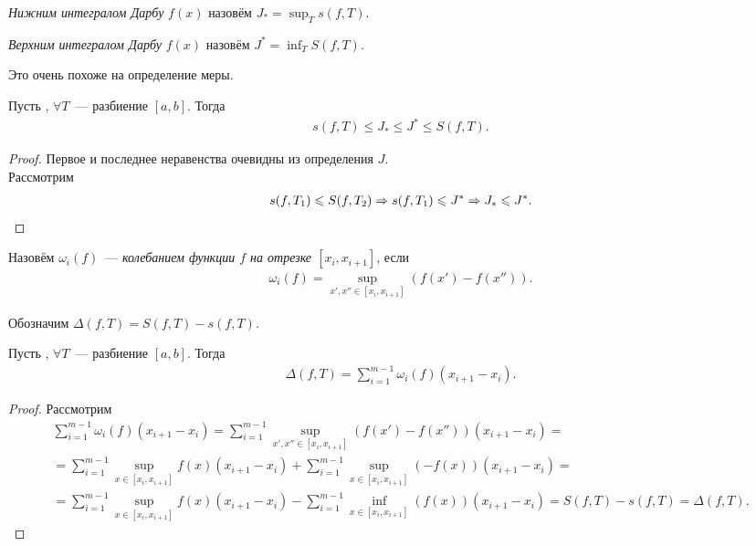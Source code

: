 \documentclass[../main.tex]{subfiles}
\begin{document}
\begin{definition}
   \emph{ Нижним интегралом Дарбу} $f(x)$ назовём $J_* = \sup_T s(f, T)$. 
\end{definition}

\begin{definition}
   \emph{ Верхним интегралом Дарбу} $f(x)$ назовём $J^* = \inf_T S(f, T)$.
\end{definition}

\begin{note}
    Это очень похоже на определение меры.
\end{note}


\begin{proposition}
    Пусть \fabr, $\forall T$~--- разбиение $[a,b]$. Тогда
    \begin{gather*}
        s(f, T) \leq J_* \leq J^* \leq S(f, T).
    \end{gather*}
\end{proposition}

\begin{proof}
    Первое и последнее неравенства очевидны из определения $J$. \\ 
    Рассмотрим
    \begin{gather*}
        s(f, T_1) \leqslant S(f, T_2) \Rightarrow s(f, T_1) \leqslant J^* \Rightarrow J_* \leqslant J^*.    
    \end{gather*}
\end{proof}

\begin{definition}
    Назовём $\omega_i(f)$~--- \emph{колебанием функции $f$ на отрезке $[x_i,x_{i+1}]$}, если 
    \begin{gather*}
        \omega_i(f) = \sup_{x',x'' \in [x_i,x_{i+1}]}(f(x') - f(x'')).
    \end{gather*}
\end{definition}

\begin{definition}
    Обозначим $\Delta(f, T) = S(f, T) - s(f, T)$.
\end{definition}

\begin{proposition}
    Пусть \fabr, $\forall T$~--- разбиение $[a,b]$. Тогда
    \begin{gather*}
        \Delta(f, T) = \sum_{i=1}^{m-1} \omega_i(f) (x_{i+1} - x_{i}).
    \end{gather*}
\end{proposition}

\begin{proof}
    Рассмотрим 
    \begin{multline*}
        \sum_{i=1}^{m-1} \omega_i(f) (x_{i+1} - x_{i}) = \sum_{i=1}^{m-1} \sup_{x',x'' \in [x_i,x_{i+1}]}(f(x') - f(x'')) (x_{i+1} - x_{i}) = \\ =\sum_{i=1}^{m-1} \sup_{x \in [x_i,x_{i+1}]}f(x)(x_{i+1} - x_{i}) + \sum_{i=1}^{m-1} \sup_{x \in [x_i,x_{i+1}]}(-f(x))(x_{i+1} - x_{i}) = \\ = \sum_{i=1}^{m-1} \sup_{x \in [x_i,x_{i+1}]}f(x)(x_{i+1} - x_{i}) - \sum_{i=1}^{m-1} \inf_{x \in [x_i,x_{i+1}]}(f(x))(x_{i+1} - x_{i}) = S(f,T) - s(f,T) = \Delta(f, T).
    \end{multline*}
\end{proof}
\end{document}
